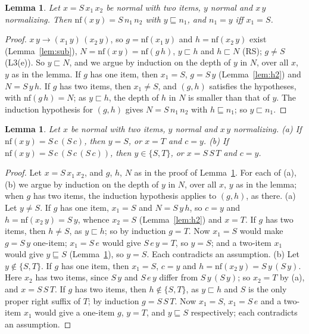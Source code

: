\documentclass[11pt]{amsart}
\newtheorem{lemma}[theorem]{Lemma}
\theoremstyle{definition}
\newcommand{\nf}{\mathrm{nf}}
\newcommand{\sqs}{\sqsubseteq}
\newcommand{\psq}{\sqsubset}
\begin{document}
\begin{lemma}\label{lem:fa}
Let $x=S\,x_1\,x_2$ be normal with two items, $y$ normal and $x\,y$ normalizing. Then
$\nf(x\,y)=S\,n_1\,n_2$ with $y\sqs n_1$, and $n_1=y$ iff $x_1=S$.
\end{lemma}

\begin{proof}
$x\,y\to(x_1\,y)\,(x_2\,y)$, so $g=\nf(x_1\,y)$ and $h=\nf(x_2\,y)$ exist (Lemma~\ref{lem:sub}),
$N=\nf(x\,y)=\nf(g\,h)$, $y\psq h$ and $h\psq N$ (RS); $g\ne S$ (L3(e)). So $y\psq N$, and we
argue by induction on the depth of $y$ in $N$, over all $x$, $y$ as in the lemma. If $g$ has one
item, then $x_1=S$, $g=S\,y$ (Lemma~\ref{lem:h2}) and $N=S\,y\,h$. If $g$ has two items, then
$x_1\ne S$, and $(g,h)$ satisfies the hypotheses, with $\nf(g\,h)=N$; as $y\psq h$, the depth of $h$
in $N$ is smaller than that of $y$. The induction hypothesis for $(g,h)$ gives $N=S\,n_1\,n_2$ with
$h\sqs n_1$; so $y\psq n_1$.
\end{proof}

\begin{lemma}\label{lem:tee}
Let $x$ be normal with two items, $y$ normal and $x\,y$ normalizing.
\textup{(a)} If $\nf(x\,y)=S\,c\,(S\,c)$, then $y=S$, or $x=T$ and $c=y$.
\textup{(b)} If $\nf(x\,y)=S\,c\,(S\,c\,(S\,c))$, then $y\in\{S,T\}$, or $x=S\,S\,T$ and $c=y$.
\end{lemma}

\begin{proof}
Let $x=S\,x_1\,x_2$, and $g$, $h$, $N$ as in the proof of Lemma~\ref{lem:fa}. For each of (a), (b)
we argue by induction on the depth of $y$ in $N$, over all $x$, $y$ as in the lemma; when $g$ has
two items, the induction hypothesis applies to $(g,h)$, as there. (a) Let $y\ne S$. If $g$ has one
item, $x_1=S$ and $N=S\,y\,h$, so $c=y$ and $h=\nf(x_2\,y)=S\,y$, whence $x_2=S$
(Lemma~\ref{lem:h2}) and $x=T$. If $g$ has two items, then $h\ne S$, as $y\psq h$; so by induction
$g=T$. Now $x_1=S$ would make $g=S\,y$ one-item; $x_1=S\,e$ would give $S\,e\,y=T$, so $y=S$; and a
two-item $x_1$ would give $y\sqs S$ (Lemma~\ref{lem:fa}), so $y=S$. Each contradicts an assumption.
(b) Let $y\notin\{S,T\}$. If $g$ has one item, then $x_1=S$, $c=y$ and $h=\nf(x_2\,y)=S\,y\,(S\,y)$.
Here $x_2$ has two items, since $S\,y$ and $S\,e\,y$ differ from $S\,y\,(S\,y)$; so $x_2=T$ by (a),
and $x=S\,S\,T$. If $g$ has two items, then $h\notin\{S,T\}$, as $y\psq h$ and $S$ is the only
proper right suffix of $T$; by induction $g=S\,S\,T$. Now $x_1=S$, $x_1=S\,e$ and a two-item $x_1$
would give a one-item $g$, $y=T$, and $y\sqs S$ respectively; each contradicts an assumption.
\end{proof}
\end{document}
